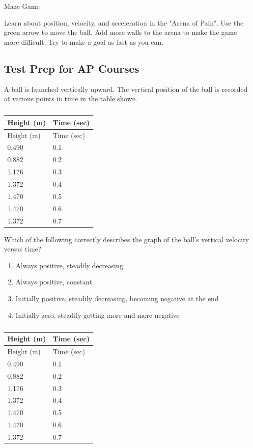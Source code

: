 \documentclass[
]{book}
\providecommand{\tightlist}{%
  \setlength{\itemsep}{0pt}\setlength{\parskip}{0pt}}
\begin{document}
\hypertarget{eip-718}{}
Maze Game

Learn about position, velocity, and acceleration in the "Arena of
Pain". Use the green arrow to move the ball. Add more walls to the
arena to make the game more difficult. Try to make a goal as fast as you
can. {\hfill\break
}

\hypertarget{fs-id1167067104720}{}

\hypertarget{fs-id1636015}{}
\hypertarget{test-prep-for-ap-courses-7}{%
\subsection{Test Prep for AP Courses}\label{test-prep-for-ap-courses-7}}

\hypertarget{fs-id1398128}{}
\leavevmode{}%
A ball is launched vertically upward. The vertical position of the ball
is recorded at various points in time in the table shown.

\begin{longtable}[]{@{}ll@{}}
\caption{{}}\tabularnewline
\toprule
Height (m) & Time (sec) \\
\midrule
\endfirsthead
\toprule
Height (m) & Time (sec) \\
\midrule
\endhead
0.490 & 0.1 \\
0.882 & 0.2 \\
1.176 & 0.3 \\
1.372 & 0.4 \\
1.470 & 0.5 \\
1.470 & 0.6 \\
1.372 & 0.7 \\
\bottomrule
\end{longtable}

Which of the following correctly describes the graph of the ball's
vertical velocity versus time?

\begin{enumerate}
\def\labelenumi{\alph{enumi}.}
\tightlist
\item
  Always positive, steadily decreasing
\item
  Always positive, constant
\item
  Initially positive, steadily decreasing, becoming negative at the
  end
\item
  Initially zero, steadily getting more and more negative
\end{enumerate}

\hypertarget{fs-id2061889}{}
\hypertarget{fs-id1418139}{}
\begin{longtable}[]{@{}ll@{}}
\caption{{}}\tabularnewline
\toprule
Height (m) & Time (sec) \\
\midrule
\endfirsthead
\toprule
Height (m) & Time (sec) \\
\midrule
\endhead
0.490 & 0.1 \\
0.882 & 0.2 \\
1.176 & 0.3 \\
1.372 & 0.4 \\
1.470 & 0.5 \\
1.470 & 0.6 \\
1.372 & 0.7 \\
\bottomrule
\end{longtable}
\end{document}
